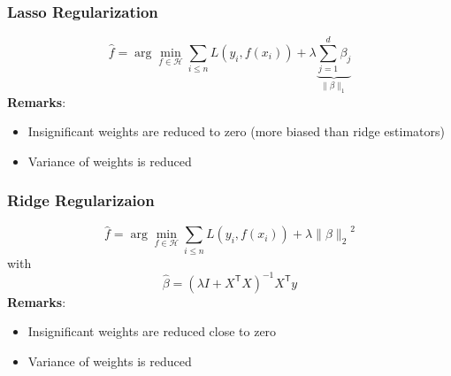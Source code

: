 \subsubsection{Lasso Regularization}
\noindent\begin{equation*}
    \widehat{f} =\arg\min_{f\in\mathcal{H}}\sum_{i\leq n}L(y_{i},f(x_{i})) + \lambda \underbrace{\sum_{j=1}^{d} \beta_j}_{\|\beta\|_1}
\end{equation*}
\textbf{Remarks}:
\begin{itemize}
    \item Insignificant weights are reduced to zero (more biased than ridge estimators)
    \item Variance of weights is reduced
\end{itemize}

\subsubsection{Ridge Regularizaion}
\noindent\begin{equation*}
    \widehat{f} =\arg\min_{f\in\mathcal{H}}\sum_{i\leq n}L(y_{i},f(x_{i})) + \lambda{\|\beta\|_2}^2
\end{equation*}
with 
\noindent\begin{equation*}
    \hat{\beta}={(\lambda I+X^{\mathsf{T}}X)}^{-1}X^{\mathsf{T}}y
\end{equation*}
\textbf{Remarks}:
\begin{itemize}
    \item Insignificant weights are reduced close to zero
    \item Variance of weights is reduced
\end{itemize}